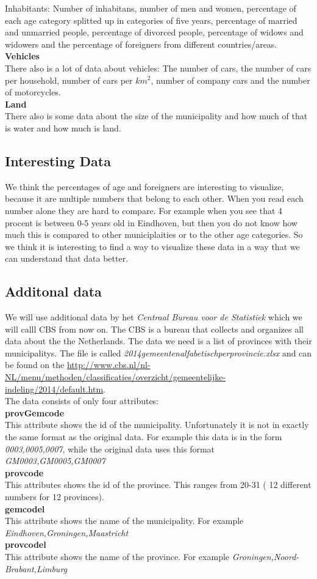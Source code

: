 Inhabitants: Number of inhabitans, number of men and women, percentage of each age category splitted up in categories of five years, percentage of married and unmarried people, percentage of divorced people, percentage of widows and widowers and the percentage of foreigners from different countries/areas. \\
 \textbf{Vehicles} \\
 There also is a lot of data about vehicles: The number of cars, the number of cars per household, number of cars per $km^{2}$, number of company cars and the number of motorcycles. \\
  \textbf{Land} \\
There also is some data about the size of the municipality and how much of that is water and how much is land. \\
\subsection{Interesting Data}
We think the percentages of age and foreigners are interesting to visualize, because it are multiple numbers that belong to each other. When you read each number alone they are hard to compare. For example when you see that 4 procent is between 0-5 years old in Eindhoven, but then you do not know how much this is compared to other municiplaities or to the other age categories. So we think it is interesting to find a way to visualize these data in a way that we can understand that data better. 
\subsection{Additonal data}
We will use additional data by het \emph{Centraal Bureau voor de Statistiek} which we will calll CBS from now on. The CBS is a bureau that collects and organizes all data about the the Netherlands. The data we need is a list of provinces with their municipalitys. The file is called \emph{2014gemeentenalfabetischperprovincie.xlsx} and can be found on the  \url{ http://www.cbs.nl/nl-NL/menu/methoden/classificaties/overzicht/gemeentelijke-indeling/2014/default.htm}.\\
The data consists of only four attributes:\\
\textbf{provGemcode} \\
This attribute shows the id of the municipality. Unfortunately it is not in exactly the same format as the original data. For example this data is in the form \emph{0003,0005,0007}, while the original data uses this format \emph{GM0003,GM0005,GM0007}\\
\textbf{provcode} \\
This attributes shows the id of the province. This ranges from 20-31 ( 12 different numbers for 12 provinces).\\
\textbf{gemcodel} \\
This attribute shows the name of the municipality. For example \emph{Eindhoven,Groningen,Maastricht} \\
\textbf{provcodel} \\
This attribute shows the name of the province. For example \emph{Groningen,Noord-Brabant,Limburg} \\
